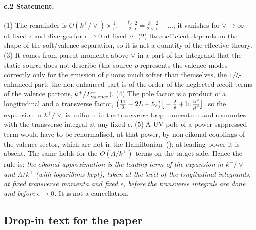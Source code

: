 \paragraph{c.2 Statement.} (1) The remainder is $O(k^+/\vee)\times\frac1\epsilon$: $-\frac{\ell_\vee}{2}\frac2\epsilon=\frac{k^+}{2\vee}\frac2\epsilon+\dots$; it vanishes for $\vee\to\infty$ at fixed $\epsilon$ and diverges for $\epsilon\to0$ at fixed $\vee$. (2) Its coefficient depends on the shape of the soft/valence separation, so it is not a quantity of the effective theory. (3) It comes from parent momenta above $\vee$ in a part of the integrand that the static source does not describe (the source $\rho$ represents the valence modes correctly only for the emission of gluons much softer than themselves, the $1/\xi$-enhanced part; the non-enhanced part is of the order of the neglected recoil terms of the valence partons, $k^+/P^+_{\rm valence}$). (4) The pole factor is a product of a longitudinal and a transverse factor, $\big(\frac{11}{3}-2L+\ell_\vee\big)\big[-\frac2\epsilon+\ln\frac{\mathbf{k}^2}{\mu^2}\big]$, so the expansion in $k^+/\vee$ is uniform in the transverse loop momentum and commutes with the transverse integral at any fixed $\epsilon$. (5) A UV pole of a power-suppressed term would have to be renormalised, at that power, by non-eikonal couplings of the valence sector, which are not in the Hamiltonian~(); at leading power it is absent. The same holds for the $O(\Lambda/k^+)$ terms on the target side. Hence the rule is: \emph{the eikonal approximation is the leading term of the expansion in $k^+/\vee$ and $\Lambda/k^+$ (with logarithms kept), taken at the level of the longitudinal integrands, at fixed transverse momenta and fixed $\epsilon$, before the transverse integrals are done and before $\epsilon\to0$.} It is not a cancellation.

\subsection{Drop-in text for the paper}\label{pr:dropin}
\begingroup\renewcommand{\eqref}[1]{(\dref{#1})}\renewcommand{\ref}[1]{\dref{#1}}

